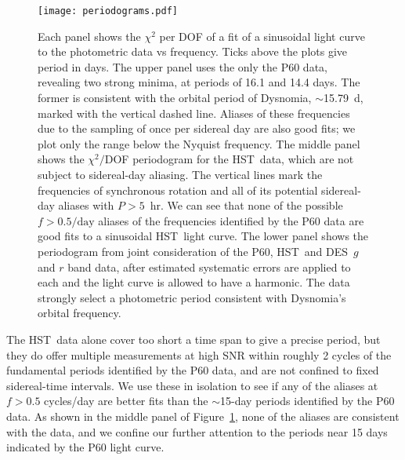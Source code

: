 \documentclass[onecolumn]{aastex631}
\newcommand{\des}{DES}
\newcommand{\hst}{HST}
\begin{document}
\begin{figure}
  \begin{center}
  \texttt{[image: periodograms.pdf]}
  \end{center}
  \caption{Each panel shows the $\chi^2$ per DOF of a fit of a sinusoidal light curve to the photometric data vs frequency.  Ticks above the plots give period in days.
The upper panel uses the only the P60 data, revealing two strong minima, at periods of 16.1 and 14.4 days. The former is consistent with the orbital period of Dysnomia, $\sim$15.79~d, marked with the vertical dashed line.  Aliases of these frequencies due to the sampling of once per sidereal day are also good fits; we plot only the range below the Nyquist frequency.  The middle panel shows the $\chi^2/$DOF periodogram for the \hst\ data, which are not subject to sidereal-day aliasing.  The vertical lines mark the frequencies of synchronous rotation and all of its potential sidereal-day aliases with $P>5$~hr.  We can see that none of the possible $f>0.5/\textrm{day}$ aliases of the frequencies identified by the P60 data are good fits to a sinusoidal \hst\ light curve. The lower panel shows the periodogram from joint consideration of the P60, \hst\, and \des\ $g$ and $r$ band data, after estimated systematic errors are applied to each and the light curve is allowed to have a harmonic.  The data strongly select a photometric period consistent with Dysnomia's orbital frequency.}
  \label{pgrams}
\end{figure}

The \hst\ data alone cover too short a time span to give a precise period, but they do offer multiple measurements at high SNR within roughly 2 cycles of the fundamental periods identified by the P60 data, and are not confined to fixed sidereal-time intervals. We use these in isolation to see if any of the aliases at $f>0.5$ cycles/day are better fits than the $\sim$15-day periods identified by the P60 data.  As shown in the middle panel of Figure~\ref{pgrams}, none of the aliases are consistent with the data, and we confine our further attention to the periods near 15 days indicated by the P60 light curve.
\end{document}

